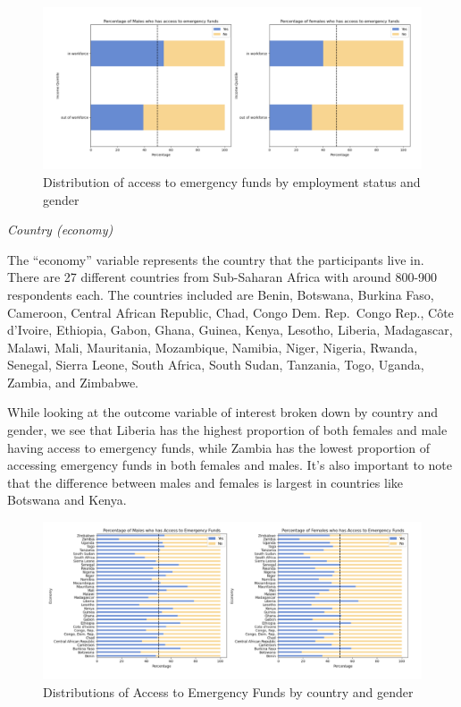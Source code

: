 \documentclass[12pt]{article}
\begin{document}
\begin{figure}

{\centering \includegraphics[width=1\linewidth]{graphs/employ_graph9} 

}

\caption{Distribution of access to emergency funds by employment status and gender}\label{fig:unnamed-chunk-11}
\end{figure}

\emph{Country (economy)}

The ``economy'' variable represents the country that the participants
live in. There are 27 different countries from Sub-Saharan Africa with
around 800-900 respondents each. The countries included are Benin,
Botswana, Burkina Faso, Cameroon, Central African Republic, Chad, Congo
Dem. Rep.~Congo Rep., Côte d'Ivoire, Ethiopia, Gabon, Ghana, Guinea,
Kenya, Lesotho, Liberia, Madagascar, Malawi, Mali, Mauritania,
Mozambique, Namibia, Niger, Nigeria, Rwanda, Senegal, Sierra Leone,
South Africa, South Sudan, Tanzania, Togo, Uganda, Zambia, and Zimbabwe.

While looking at the outcome variable of interest broken down by country
and gender, we see that Liberia has the highest proportion of both
females and male having access to emergency funds, while Zambia has the
lowest proportion of accessing emergency funds in both females and
males. It's also important to note that the difference between males and
females is largest in countries like Botswana and Kenya.

\begin{figure}

{\centering \includegraphics[width=1\linewidth]{graphs/country_graph10} 

}

\caption{Distributions of Access to Emergency Funds by country and gender}\label{fig:unnamed-chunk-12}
\end{figure}
\end{document}
